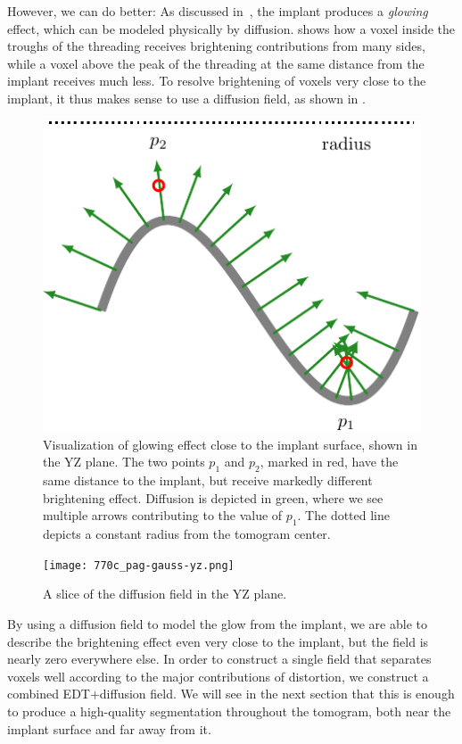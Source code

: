 However, we can do better: As discussed in~, the implant produces a \textit{glowing} effect, which
can be modeled physically by diffusion.  shows
how a voxel inside the troughs of the threading receives brightening contributions from many sides, while a voxel above the peak of the threading at
the same distance from the implant receives much less. To resolve brightening of voxels very close to the implant, it thus makes sense
to use a diffusion field, as shown in . 


\begin{figure}
    \centering
    \includegraphics{glowing-crop}
    \caption{Visualization of glowing effect close to the implant surface, shown in the YZ plane. 
        The two points $p_1$ and $p_2$, marked in red, have the same distance to the implant, but receive markedly different brightening effect.
        Diffusion is depicted in green, where we see multiple arrows contributing to the value of $p_1$. The dotted line depicts a constant radius from the tomogram center.}
    \label{fig:edt-vs-diffusion}
\end{figure}


\begin{figure}
    \texttt{[image: 770c\_pag-gauss-yz.png]}
    \caption{A slice of the diffusion field in the YZ plane.}
    \label{fig:field-slice}
\end{figure}

By using a diffusion field to model the glow from the implant, we are able to describe the brightening effect even very close to the implant, but the field is nearly
zero everywhere else. In order
to construct a single field that separates voxels well according to the major contributions of distortion, we construct a combined EDT+diffusion field. We will see
in the next section that this is enough to produce a high-quality segmentation throughout the tomogram, both near the implant surface and far away from it.


